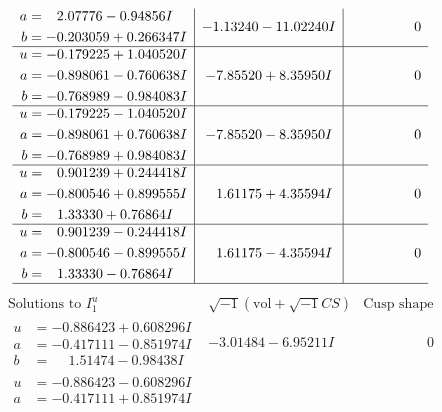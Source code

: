 \documentclass[1p]{elsarticle_modified}
\theoremstyle{definition}
\newcommand{\I}{\sqrt{-1}}
\begin{document}
$$\begin{array}{c|c|c}
\begin{aligned}
a &= \phantom{-}2.07776 - 0.94856 I \\
b &= -0.203059 + 0.266347 I\end{aligned}
 & -1.13240 - 11.02240 I & \phantom{-0.000000 } 0 \\ \hline\begin{aligned}
u &= -0.179225 + 1.040520 I \\
a &= -0.898061 - 0.760638 I \\
b &= -0.768989 - 0.984083 I\end{aligned}
 & -7.85520 + 8.35950 I & \phantom{-0.000000 } 0 \\ \hline\begin{aligned}
u &= -0.179225 - 1.040520 I \\
a &= -0.898061 + 0.760638 I \\
b &= -0.768989 + 0.984083 I\end{aligned}
 & -7.85520 - 8.35950 I & \phantom{-0.000000 } 0 \\ \hline\begin{aligned}
u &= \phantom{-}0.901239 + 0.244418 I \\
a &= -0.800546 + 0.899555 I \\
b &= \phantom{-}1.33330 + 0.76864 I\end{aligned}
 & \phantom{-}1.61175 + 4.35594 I & \phantom{-0.000000 } 0 \\ \hline\begin{aligned}
u &= \phantom{-}0.901239 - 0.244418 I \\
a &= -0.800546 - 0.899555 I \\
b &= \phantom{-}1.33330 - 0.76864 I\end{aligned}
 & \phantom{-}1.61175 - 4.35594 I & \phantom{-0.000000 } 0\\
 \hline 
 \end{array}$$\newpage$$\begin{array}{c|c|c}  
\text{Solutions to }I^u_{1}& \I (\text{vol} + \sqrt{-1}CS) & \text{Cusp shape}\\
 \hline 
\begin{aligned}
u &= -0.886423 + 0.608296 I \\
a &= -0.417111 - 0.851974 I \\
b &= \phantom{-}1.51474 - 0.98438 I\end{aligned}
 & -3.01484 - 6.95211 I & \phantom{-0.000000 } 0 \\ \hline\begin{aligned}
u &= -0.886423 - 0.608296 I \\
a &= -0.417111 + 0.851974 I \\

\end{aligned}
\end{array}$$
\end{document}
